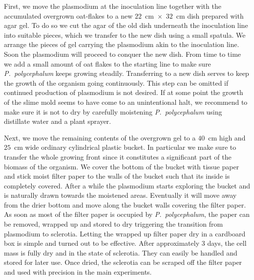   First, we move the plasmodium at the inoculation line together with the accumulated overgrown oat-flakes to a new $22$~cm~$\times$~$32$~cm dish prepared with agar gel. To do so we cut the agar of the old dish underneath the inoculation line into suitable pieces, which we transfer to the new dish using a small spatula. We arrange the pieces of gel carrying the plasmodium akin to the inoculation line. Soon the plasmodium will proceed to conquer the new dish. From time to time we add a small amount of oat flakes to the starting line to make sure \emph{P.~polycephalum} keeps growing steadily. Transferring to a new dish serves to keep the growth of the organism going continuously. This step can be omitted if continued production of plasmodium is not desired. If at some point the growth of the slime mold seems to have come to an unintentional halt, we recommend to make sure it is not to dry by carefully moistening \emph{P.~polycephalum} using distillate water and a plant sprayer.

  Next, we move the remaining contents of the overgrown gel to a $40$~cm high and $25$~cm wide ordinary cylindrical plastic bucket. In particular we make sure to transfer the whole growing front since it constitutes a significant part of the biomass of the organism. We cover the bottom of the bucket with tissue paper and stick moist filter paper to the walls of the bucket such that its inside is completely covered. After a while the plasmodium starts exploring the bucket and is naturally drawn towards the moistened areas. Eventually it will move away from the drier bottom and move along the bucket walls covering the filter paper. As soon as most of the filter paper is occupied by \emph{P.~polycephalum}, the paper can be removed, wrapped up and stored to dry triggering the transition from plasmodium to sclerotia. Letting the wrapped up filter paper dry in a cardboard box is simple and turned out to be effective. After approximately $3$ days, the cell mass is fully dry and in the state of sclerotia. They can easily be handled and stored for later use. Once dried, the sclerotia can be scraped off the filter paper and used with precision in the main experiments.
